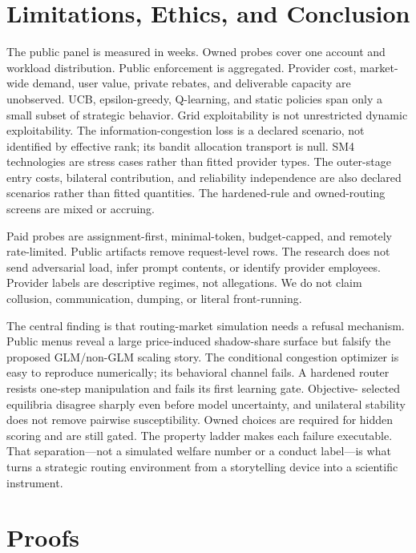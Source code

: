 \documentclass[10pt]{article}
\newcommand{\1}{\mathbf 1}
\begin{document}
\section{Limitations, Ethics, and Conclusion}

The public panel is measured in weeks.  Owned probes cover one account and
workload distribution.  Public enforcement is aggregated.  Provider cost,
market-wide demand, user value, private rebates, and deliverable capacity are
unobserved.  UCB, epsilon-greedy, Q-learning, and static policies span only a
small subset of strategic behavior.  Grid exploitability is not unrestricted
dynamic exploitability.  The information-congestion loss is a declared
scenario, not identified by effective rank; its bandit allocation transport is
null.  SM4 technologies are stress cases rather than fitted provider types.  The
outer-stage entry costs, bilateral contribution, and reliability independence
are also declared scenarios rather than fitted quantities.  The
hardened-rule and owned-routing screens are mixed or accruing.

Paid probes are assignment-first, minimal-token, budget-capped, and remotely
rate-limited.  Public artifacts remove request-level rows.  The research does not
send adversarial load, infer prompt contents, or identify provider employees.
Provider labels are descriptive regimes, not allegations.  We do not claim
collusion, communication, dumping, or literal front-running.

The central finding is that routing-market simulation needs a refusal mechanism.
Public menus reveal a large price-induced shadow-share surface but falsify the
proposed GLM/non-GLM scaling story.  The conditional congestion optimizer is
easy to reproduce numerically; its behavioral channel fails.  A hardened router
resists one-step manipulation and fails its first learning gate.  Objective-
selected equilibria disagree sharply even before model uncertainty, and
unilateral stability does not remove pairwise susceptibility.  Owned choices
are required for hidden scoring and are still gated.  The property ladder makes
each failure executable.  That separation---not a simulated welfare number or a
conduct label---is what turns a strategic routing environment from a
storytelling device into a scientific instrument.

\appendix

\section{Proofs}
\end{document}
